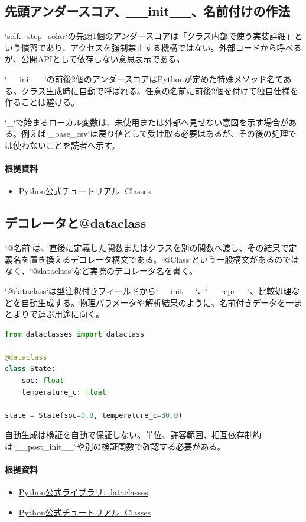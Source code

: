 \documentclass[a4paper,11pt]{article}
\begin{document}
\subsection{先頭アンダースコア、\_\_init\_\_、名前付けの作法}
`self.\_step\_solar`の先頭1個のアンダースコアは「クラス内部で使う実装詳細」という慣習であり、アクセスを強制禁止する機構ではない。外部コードから呼べるが、公開APIとして依存しない意思表示である。


`\_\_init\_\_`の前後2個のアンダースコアはPythonが定めた特殊メソッド名である。クラス生成時に自動で呼ばれる。任意の名前に前後2個を付けて独自仕様を作ることは避ける。


`\_`で始まるローカル変数は、未使用または外部へ見せない意図を示す場合がある。例えば`\_base\_csv`は戻り値として受け取る必要はあるが、その後の処理では使わないことを読者へ示す。

\paragraph{根拠資料}
\begin{itemize}[leftmargin=1.6em]
\item \href{https://docs.python.org/3/tutorial/classes.html}{Python公式チュートリアル: Classes}
\end{itemize}

\subsection{デコレータと@dataclass}
`@名前`は、直後に定義した関数またはクラスを別の関数へ渡し、その結果で定義名を置き換えるデコレータ構文である。`@Class`という一般構文があるのではなく、`@dataclass`など実際のデコレータ名を書く。


`@dataclass`は型注釈付きフィールドから`\_\_init\_\_`、`\_\_repr\_\_`、比較処理などを自動生成する。物理パラメータや解析結果のように、名前付きデータを一まとまりで運ぶ用途に向く。


\begin{lstlisting}[language=python]
from dataclasses import dataclass

@dataclass
class State:
    soc: float
    temperature_c: float

state = State(soc=0.8, temperature_c=30.0)
\end{lstlisting}


自動生成は検証を自動で保証しない。単位、許容範囲、相互依存制約は`\_\_post\_init\_\_`や別の検証関数で確認する必要がある。

\paragraph{根拠資料}
\begin{itemize}[leftmargin=1.6em]
\item \href{https://docs.python.org/3/library/dataclasses.html}{Python公式ライブラリ: dataclasses}
\item \href{https://docs.python.org/3/tutorial/classes.html}{Python公式チュートリアル: Classes}
\end{itemize}
\end{document}
